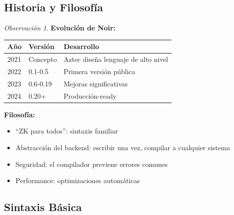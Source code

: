 \documentclass[11pt,a4paper,twoside,openright]{book}
\theoremstyle{definition}
\theoremstyle{plain}
\theoremstyle{remark}
\newtheorem{remark}{Observación}[chapter]
\begin{document}
\subsection{Historia y Filosofía}

\begin{remark}
\textbf{Evolución de Noir:}

\begin{center}
\begin{tabular}{lll}
\toprule
\textbf{Año} & \textbf{Versión} & \textbf{Desarrollo} \\
\midrule
2021 & Concepto & Aztec diseña lenguaje de alto nivel \\
2022 & 0.1-0.5 & Primera versión pública \\
2023 & 0.6-0.19 & Mejoras significativas \\
2024 & 0.20+ & Producción-ready \\
\bottomrule
\end{tabular}
\end{center}

\textbf{Filosofía:}
\begin{itemize}
    \item ``ZK para todos'': sintaxis familiar
    \item Abstracción del backend: escribir una vez, compilar a cualquier sistema
    \item Seguridad: el compilador previene errores comunes
    \item Performance: optimizaciones automáticas
\end{itemize}
\end{remark}

\subsection{Sintaxis Básica}
\end{document}
